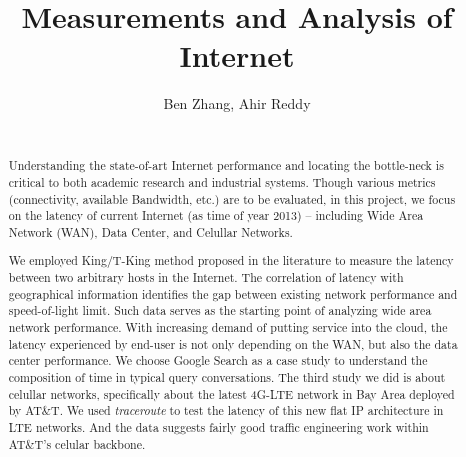 \documentclass{sig-alternate-10pt}
\begin{document}


\setlength{\paperheight}{11in}
\setlength{\paperwidth}{8.5in}
\setlength{\pdfpageheight}{\paperheight}
\setlength{\pdfpagewidth}{\paperwidth}

\setlength{\textfloatsep}{13pt plus 2pt minus 1pt}

\title{Measurements and Analysis of Internet}

\author{
{Ben Zhang, Ahir Reddy}\\
\\
}

\maketitle

\begin{abstract}
Understanding the state-of-art Internet performance and locating the bottle-neck is critical to both academic research and industrial systems. Though various metrics (connectivity, available Bandwidth, etc.) are to be evaluated, in this project, we focus on the latency of current Internet (as time of year 2013) -- including Wide Area Network (WAN), Data Center, and Celullar Networks. 

We employed King/T-King method proposed in the literature to measure the latency between two arbitrary hosts in the Internet. The correlation of latency with geographical information identifies the gap between existing network performance and speed-of-light limit. Such data serves as the starting point of analyzing wide area network performance. With increasing demand of putting service into the cloud, the latency experienced by end-user is not only depending on the WAN, but also the data center performance. We choose Google Search as a case study to understand the composition of time in typical query conversations. The third study we did is about celullar networks, specifically about the latest 4G-LTE network in Bay Area deployed by AT\&T. We used {\it traceroute} to test the latency of this new flat IP architecture in LTE networks. And the data suggests fairly good traffic engineering work within AT\&T's celular backbone.

\end{abstract}
\end{document}

